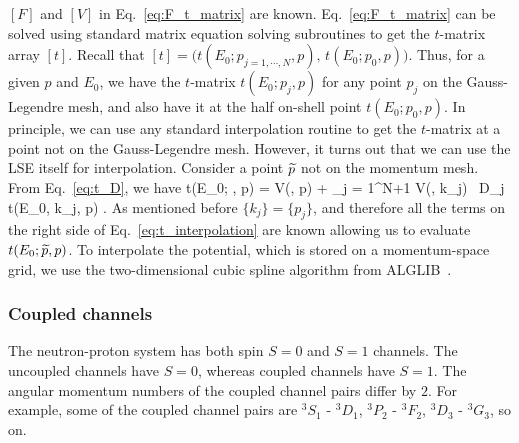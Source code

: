   $[F]$ and $[V]$ in Eq.~\eqref{eq:F_t_matrix} are
  known.  Eq.~\eqref{eq:F_t_matrix} can be solved using standard matrix equation
  solving subroutines to get the $t$-matrix array $[t]$.  Recall that
  $\displaystyle {[t] = \big( t(E_0; p_{j = 1,\cdots, N}, p), \, t(E_0; p_0, p)
  \big)}$.  Thus, for a given $p$ and $E_0$, we have the $t$-matrix
  $t(E_0; p_j, p)$ for any point $p_j$ on the Gauss-Legendre mesh, and also
  have it at the half on-shell point $t(E_0; p_0, p)$.  In principle, we can
  use any standard interpolation routine to get the $t$-matrix at a point
  not on the Gauss-Legendre mesh.  However, it turns out that we can use the
  LSE itself for interpolation.  Consider a point $\widetilde{p}$ not on the momentum
  mesh.  From Eq.~\eqref{eq:t_D}, we have
  \beq
  t(E_0; , p) = V(, p) + \sum_{j = 1}^{N+1}
  V(, k_j) \, D_j \, t(E_0, k_j, p) \;.
  \label{eq:t_interpolation}
  \eeq
  As mentioned before $\{k_j\} = \{p_j\}$, and therefore all the terms on the
  right side of Eq.~\eqref{eq:t_interpolation} are known allowing us to
  evaluate $t(E_0; \widetilde{p}, p)$.  To interpolate the potential, which is stored
  on a momentum-space grid, we use
	the two-dimensional cubic spline algorithm from ALGLIB~\cite{ALGLIB:0915}.

  \medskip
  \subsubsection{Coupled channels}

  The neutron-proton system has both spin $S = 0$ and $S = 1$ channels.  The
  uncoupled channels have $S = 0$, whereas coupled channels have $S = 1$.
  The angular momentum numbers of the coupled channel pairs differ by $2$.
  For example, some of the coupled channel pairs are $^3 S_1$ - $^3 D_1$,
  $^3 P_2$ - $^3 F_2$, $^3 D_3$ - $^3 G_3$, so on.

